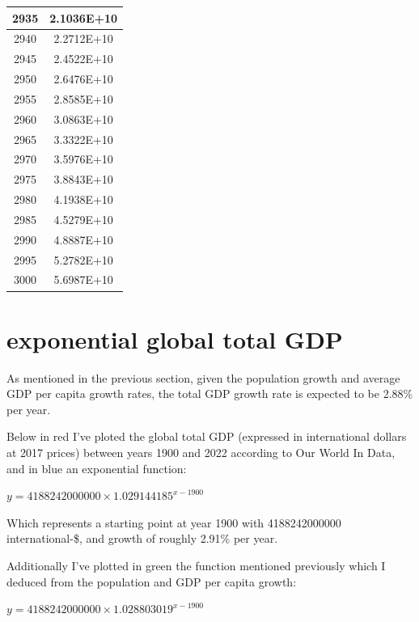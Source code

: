 \documentclass[a4paper]{article}
\begin{document}
\begin{tabular}{|c|c|}
		\hline
		2935 & 2.1036E+10 \\
		\hline
		2940 & 2.2712E+10 \\
		\hline
		2945 & 2.4522E+10 \\
		\hline
		2950 & 2.6476E+10 \\
		\hline
		2955 & 2.8585E+10 \\
		\hline
		2960 & 3.0863E+10 \\
		\hline
		2965 & 3.3322E+10 \\
		\hline
		2970 & 3.5976E+10 \\
		\hline
		2975 & 3.8843E+10 \\
		\hline
		2980 & 4.1938E+10 \\
		\hline
		2985 & 4.5279E+10 \\
		\hline
		2990 & 4.8887E+10 \\
		\hline
		2995 & 5.2782E+10 \\
		\hline
		3000 & 5.6987E+10 \\
		\hline
	\end{tabular}
	
	\normalsize
	
	\pagebreak
	
	\section{exponential global total GDP}
	
	As mentioned in the previous section, given the population growth and average GDP per capita growth rates, the total GDP growth rate is expected to be 2.88\% per year.
	
	\medskip
	
	Below in red I've ploted the global total GDP (expressed in international dollars at 2017 prices) between years 1900 and 2022 according to Our World In Data, and in blue an exponential function:
	
	\begin{center}
		{\large $ y = 4188242000000 \times 1.029144185^{x-1900} $}
	\end{center}
	
	\noindent Which represents a starting point at year 1900 with 4188242000000 international-\$, and growth of roughly 2.91\% per year.
	
	\bigskip
	
	Additionally I've plotted in green the function mentioned previously which I deduced from the population and GDP per capita growth:
	
	\begin{center}
		{\large $ y = 4188242000000 \times 1.028803019^{x-1900} $}
	\end{center}
\end{document}
